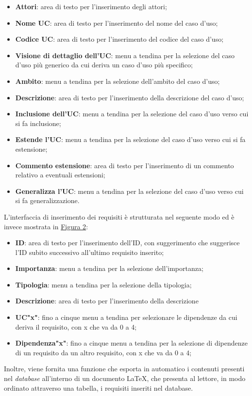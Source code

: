 \begin{itemize}
	\item \textbf{Attori}: area di testo per l'inserimento degli attori;
	\item \textbf{Nome UC}: area di testo per l'inserimento del nome del caso d'uso;
	\item \textbf{Codice UC}: area di testo per l'inserimento del codice del caso d'uso;
	\item \textbf{Visione di dettaglio dell'UC}: menu a tendina per la selezione del caso d'uso più generico da cui deriva un caso d'uso più specifico;
	\item \textbf{Ambito}: menu a tendina per la selezione dell'ambito del caso d'uso;
	\item \textbf{Descrizione}: area di testo per l'inserimento della descrizione del caso d'uso;
	\item \textbf{Inclusione dell'UC}: menu a tendina per la selezione del caso d'uso verso cui si fa inclusione;
	\item \textbf{Estende l'UC}: menu a tendina per la selezione del caso d'uso verso cui si fa estensione;
	\item \textbf{Commento estensione}: area di testo per l'inserimento di un commento relativo a eventuali estensioni;
	\item \textbf{Generalizza l'UC}: menu a tendina per la selezione del caso d'uso verso cui si fa generalizzazione.
\end{itemize}
L'interfaccia di inserimento dei requisiti è strutturata nel seguente modo ed è invece mostrata in \hyperref[sec:Figura2]{Figura 2}:
\begin{itemize}
	\item \textbf{ID}: area di testo per l'inserimento dell'ID, con suggerimento che suggerisce l'ID subito successivo all'ultimo requisito inserito;
	\item \textbf{Importanza}: menu a tendina per la selezione dell'importanza;
	\item \textbf{Tipologia}: menu a tendina per la selezione della tipologia;
	\item \textbf{Descrizione}: area di testo per l'inserimento della descrizione
	\item \textbf{UC"x"}: fino a cinque menu a tendina per selezionare le dipendenze da cui deriva il requisito, con x che va da 0 a 4;
	\item \textbf{Dipendenza"x"}: fino a cinque menu a tendina per la selezione di dipendenze di un requisito da un altro requisito, con x che va da 0 a 4;
\end{itemize}
Inoltre, viene fornita una funzione che esporta in automatico i contenuti presenti nel \textit{database} all'interno di un documento \LaTeX, che presenta al lettore, in modo ordinato attraverso una tabella, i requisiti inseriti nel database.

